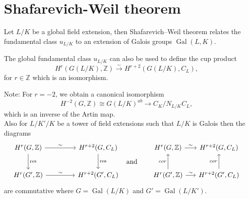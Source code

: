 \documentclass{article}
\newtheorem{definition}{Definition}[section]
\theoremstyle{break}
\def\Gal{\mathop{\mathrm{Gal}}\nolimits}
\def\Gal{\mathop{\mathrm{Gal}}\nolimits}
\def\rest{\mathop{\mathrm{res}}\nolimits}
\def\Gal{\mathop{\mathrm{Gal}}\nolimits}
\begin{document}
\section{Shafarevich-Weil theorem }
Let $L/K$ be a global field extension, then Shafarevich–Weil theorem relates the fundamental class $u_{L/K}$ to an extension of Galois groups $\Gal(L,K)$.


The global fundamental class $u_{L/K}$ can also be used to define the cup product  
\[ H^{r}(G(L/K), \mathbb{Z})\xrightarrow{\sim} H^{r+2}(G(L/K), C_{L}),   \]
for $r \in \mathbb{Z}$ which is an isomorphism.

Note: For $r=-2$, we obtain a canonical isomorphism 
\[ H^{-2}(G,\mathbb{Z})\cong G(L/K)^{ab}\rightarrow C_{K}/N_{L/K}C_{L},  \]
which is an inverse of the Artin map.\\

Also for $L/K'/K$ be a tower of field extensions such that $L/K$ is Galois then the diagrams \\
\[\begin{tikzcd} [row sep=0.4em, column sep=1.5em]
H^{r}(G, \mathbb{Z})\arrow{dd}{\rest} \arrow{r}{\sim} & H^{r+2}(G, C_{L})\arrow{dd}{\rest}  &  H^{r}(G, \mathbb{Z})\arrow{r}{\sim} & H^{r+2}(G, C_{L}) \\
  &   \hspace{3.5cm}\text{and} &   & \\
H^{r}(G', \mathbb{Z})\arrow{r}{\sim} & H^{r+2}(G', C_{L})  & H^{r}(G', \mathbb{Z})\arrow{r}{\sim}\arrow{uu}{cor}  & H^{r+2}(G', C_{L})\arrow{uu}{cor}
\end{tikzcd}\]
are commutative where $G= \Gal(L/K)$ and $G'=\Gal(L/K')$.\\


\end{document}
